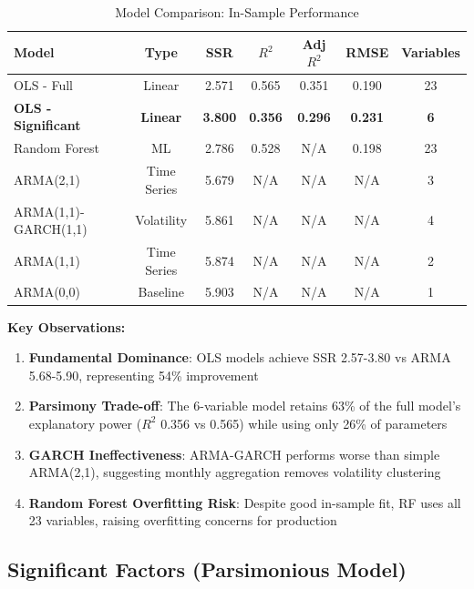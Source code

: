 \documentclass[12pt,a4paper]{article}
\begin{document}
\begin{table}[H]
\centering
\caption{Model Comparison: In-Sample Performance}
\label{tab:model_comparison}
\begin{tabular}{@{}lcccccc@{}}
\toprule
\textbf{Model} & \textbf{Type} & \textbf{SSR} & \textbf{$R^2$} & \textbf{Adj $R^2$} & \textbf{RMSE} & \textbf{Variables} \\
\midrule
OLS - Full & Linear & 2.571 & 0.565 & 0.351 & 0.190 & 23 \\
\textbf{OLS - Significant} & \textbf{Linear} & \textbf{3.800} & \textbf{0.356} & \textbf{0.296} & \textbf{0.231} & \textbf{6} \\
Random Forest & ML & 2.786 & 0.528 & N/A & 0.198 & 23 \\
ARMA(2,1) & Time Series & 5.679 & N/A & N/A & N/A & 3 \\
ARMA(1,1)-GARCH(1,1) & Volatility & 5.861 & N/A & N/A & N/A & 4 \\
ARMA(1,1) & Time Series & 5.874 & N/A & N/A & N/A & 2 \\
ARMA(0,0) & Baseline & 5.903 & N/A & N/A & N/A & 1 \\
\bottomrule
\end{tabular}
\end{table}

\textbf{Key Observations:}

\begin{enumerate}
    \item \textbf{Fundamental Dominance}: OLS models achieve SSR 2.57-3.80 vs ARMA 5.68-5.90, representing 54\% improvement

    \item \textbf{Parsimony Trade-off}: The 6-variable model retains 63\% of the full model's explanatory power ($R^2$ 0.356 vs 0.565) while using only 26\% of parameters

    \item \textbf{GARCH Ineffectiveness}: ARMA-GARCH performs worse than simple ARMA(2,1), suggesting monthly aggregation removes volatility clustering

    \item \textbf{Random Forest Overfitting Risk}: Despite good in-sample fit, RF uses all 23 variables, raising overfitting concerns for production
\end{enumerate}

\subsection{Significant Factors (Parsimonious Model)}
\end{document}
